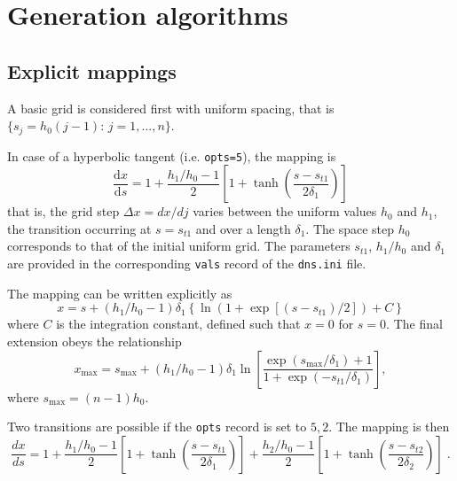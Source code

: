 \section{Generation algorithms}

\subsection{Explicit mappings}
A basic grid is considered first with uniform spacing, that is
$\{s_j=h_0(j-1):\, j = 1,\ldots,n\}$.

In case of a hyperbolic tangent (i.e. {\tt opts=5}), the mapping is
\begin{equation}
\frac{\mathrm{d}x}{\mathrm{d}s} = 1 + \frac{h_1/h_0-1}{2}\left[ 1 + \tanh\left(\frac{s-s_{t1}}{2\delta_1}\right)\right]
\end{equation}
that is, the grid step $\Delta x =dx/dj$ varies between the uniform values $h_0$
and $h_1$, the transition occurring at $s=s_{t1}$ and over a length $\delta_1$. The
space step $h_0$ corresponds to that of the initial uniform grid. The parameters
$s_{t1}$, $h_1/h_0$ and $\delta_1$ are provided in the corresponding {\tt vals}
record of the {\tt dns.ini} file.

The mapping can be written explicitly as
\begin{equation}
  x = s + (h_1/h_0-1)\delta_1\left\{\ln(1+\exp[(s-s_{t1})/2])+C\right\}
\end{equation}
where $C$ is the integration constant, defined such that $x=0$ for $s=0$. The final extension obeys the relationship
\begin{equation}
  x_\mathrm{max}=s_\mathrm{max} + (h_1/h_0-1)\delta_1\ln\left[\frac{\exp(s_\mathrm{max}/\delta_1)+1}{1+\exp(-s_{t1}/\delta_1)}\right],
\end{equation}
where $s_\mathrm{max} =(n-1)h_0$.

Two transitions are possible if the {\tt opts} record is set to $5,2$. The
mapping is then
\begin{equation}
\frac{dx}{ds} = 1
+ \frac{h_1/h_0-1}{2}\left[ 1 + \tanh\left(\frac{s-s_{t1}}{2\delta_1}\right)\right]
+ \frac{h_2/h_0-1}{2}\left[ 1 + \tanh\left(\frac{s-s_{t2}}{2\delta_2}\right)\right]\;.
\end{equation}

